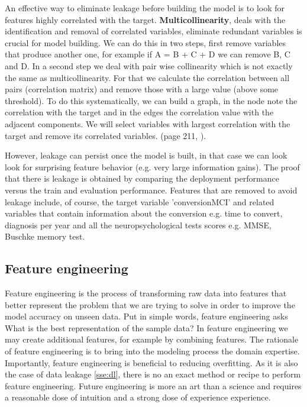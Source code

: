 \documentclass[11pt]{article}
\theoremstyle{definition}
\theoremstyle{remark}
\begin{document}

An effective way to eliminate leakage before building the model is to look for features highly correlated with the target. \textbf{Multicollinearity}, deals with the identification and removal of correlated variables, eliminate redundant variables is crucial for model building. We can do this in two steps, first remove variables that produce another one, for example if A = B + C + D we can remove B, C and D. 
In a second step we deal with pair wise collinearity which is not exactly the same as multicollinearity. For that we calculate the correlation between all pairs (correlation matrix) and remove those with a large value (above some threshold). To do this systematically, we can build a graph, in the node note the correlation with the target and in the edges the correlation value with the adjacent components. We will select variables with largest correlation with the target and remove its correlated variables. (page 211, \cite{wu2012foundations}).

However, leakage can persist once the model is built, in that case we can look look for surprising feature behavior (e.g. very large information gains). The proof that there is leakage is obtained by comparing the deployment performance versus the train and evaluation performance. Features that are removed to avoid leakage include, of course, the target variable 'conversionMCI' and related variables that contain information about the conversion e.g. time to convert, diagnosis per year and all the neuropsychological tests scores e.g. MMSE, Buschke memory test.

\subsection{Feature engineering}
\label{sse:fe}
Feature engineering is the process of transforming raw data into features that better represent the problem that we are trying to solve in order to improve the model accuracy on unseen data. 
Put in simple words, feature engineering asks What is the best representation of the sample data?
In feature engineering we may create additional features, for example by combining features. The rationale of feature engineering is to bring into the modeling process the domain expertise. Importantly, feature engineering is beneficial to reducing overfitting. As it is also the case of data leakage \ref{sse:dl}, there is no an exact method or recipe to perform feature engineering. Future engineering is more an art than a science and requires a reasonable dose of intuition and a strong dose of experience experience.
\end{document}
